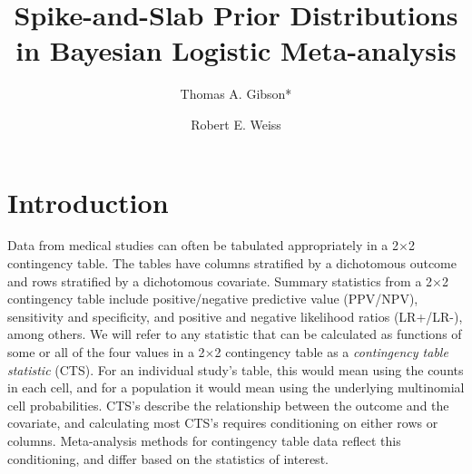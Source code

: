 \documentclass[AMA,STIX1COL]{WileyNJD-v2}
\begin{document}
\title{Spike-and-Slab Prior Distributions in Bayesian Logistic Meta-analysis}

\author[1]{Thomas A. Gibson*}

\author[1]{Robert E. Weiss}




\address[1]{, , }



\abstract[Summary]{}



\maketitle


\doublespacing

\section{Introduction} \label{sec:intro}


Data from medical studies can often be tabulated appropriately in a 2$\times$2 contingency table. The tables have columns stratified by a dichotomous outcome and rows stratified by a dichotomous covariate. Summary statistics from a 2$\times$2 contingency table include positive/negative predictive value (PPV/NPV), sensitivity and specificity, and positive and negative likelihood ratios (LR+/LR-), among others. We will refer to any statistic that can be calculated as functions of some or all of the four values in a 2$\times$2 contingency table as a \textit{contingency table statistic} (CTS). For an individual study's table, this would mean using the counts in each cell, and for a population it would mean using the underlying multinomial cell probabilities. CTS's describe the relationship between the outcome and the covariate, and calculating most CTS's requires conditioning on either rows or columns. Meta-analysis methods for contingency table data reflect this conditioning, and differ based on the statistics of interest. 
\end{document}
